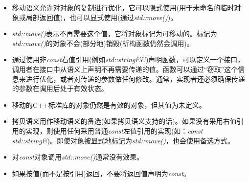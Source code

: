 \begin{itemize}
	\item 移动语义允许对对象的复制进行优化，它可以隐式使用(用于未命名的临时对象或局部返回值)，也可以显式使用(通过\textit{std::move()})。
	\item \textit{std::move()}表示不再需要这个值，它将对象标记为可移动的。标记为\textit{std::move()}的对象不会(部分地)销毁(析构函数仍然会调用)。
	\item 通过使用非\textit{const}右值引用(例如\textit{std::string\&\&})声明函数，可以定义一个接口，调用者在接口中从语义上声明不再需要传递的值。函数可以通过“窃取”这个信息来进行优化，或者对传递的参数做任何修改。通常，实现者还必须确保传递的参数在调用后处于有效状态。
	\item 移动的C++标准库的对象仍然是有效的对象，但其值为未定义。
	\item 拷贝语义用作移动语义的备选(如果拷贝语义支持的话)。如果没有采用右值引用的实现，则使用任何采用普通\textit{const}左值引用的实现(如：\textit{const std::string\&})。即使对象被显式地标记为\textit{std::move()}，也会使用备选方式。
	\item 对\textit{const}对象调用\textit{std::move()}通常没有效果。
	\item 如果按值(而不是按引用)返回，不要将返回值声明为\textit{const}。
\end{itemize}

\newpage